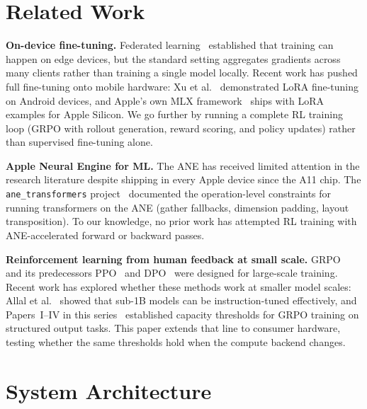 \documentclass[11pt]{article}
\begin{document}
\section{Related Work}
\label{sec:related}

\textbf{On-device fine-tuning.}  Federated learning~\cite{mcmahan2017fedavg} established that training can happen on edge devices, but the standard setting aggregates gradients across many clients rather than training a single model locally.  Recent work has pushed full fine-tuning onto mobile hardware: Xu et al.~\cite{xu2024ondevice} demonstrated LoRA fine-tuning on Android devices, and Apple's own MLX framework~\cite{hannun2023mlx} ships with LoRA examples for Apple Silicon.  We go further by running a complete RL training loop (GRPO with rollout generation, reward scoring, and policy updates) rather than supervised fine-tuning alone.

\textbf{Apple Neural Engine for ML.}  The ANE has received limited attention in the research literature despite shipping in every Apple device since the A11 chip.  The \texttt{ane\_transformers} project~\cite{anemll2024} documented the operation-level constraints for running transformers on the ANE (gather fallbacks, dimension padding, layout transposition).  To our knowledge, no prior work has attempted RL training with ANE-accelerated forward or backward passes.

\textbf{Reinforcement learning from human feedback at small scale.}  GRPO~\cite{grpo} and its predecessors PPO~\cite{schulman2017ppo} and DPO~\cite{rafailov2024dpo} were designed for large-scale training.  Recent work has explored whether these methods work at smaller model scales: Allal et al.~\cite{allal2024smollm2} showed that sub-1B models can be instruction-tuned effectively, and Papers~I--IV in this series~\cite{maloney2025deploymentgap,maloney2025capacity,maloney2025agentslobench,maloney2025dynamics} established capacity thresholds for GRPO training on structured output tasks.  This paper extends that line to consumer hardware, testing whether the same thresholds hold when the compute backend changes.

\section{System Architecture}
\label{sec:architecture}
\end{document}
